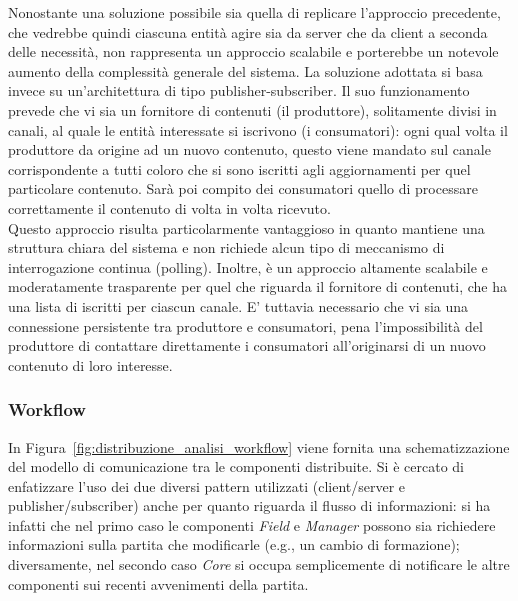 Nonostante una soluzione possibile sia quella di replicare l'approccio precedente, che vedrebbe quindi ciascuna entità agire sia da server che da client a seconda delle necessità, non rappresenta un approccio scalabile e porterebbe un notevole aumento della complessità generale del sistema. La soluzione adottata si basa invece su un'architettura di tipo publisher-subscriber. Il suo funzionamento prevede che vi sia un fornitore di contenuti (il produttore), solitamente divisi in canali, al quale le entità interessate si iscrivono (i consumatori): ogni qual volta il produttore da origine ad un nuovo contenuto, questo viene mandato sul canale corrispondente a tutti coloro che si sono iscritti agli aggiornamenti per quel particolare contenuto. Sarà poi compito dei consumatori quello di processare correttamente il contenuto di volta in volta ricevuto.\\

Questo approccio risulta particolarmente vantaggioso in quanto mantiene una struttura chiara del sistema e non richiede alcun tipo di meccanismo di interrogazione continua (polling). Inoltre, è un approccio altamente scalabile e moderatamente trasparente per quel che riguarda il fornitore di contenuti, che ha una lista di iscritti per ciascun canale. E' tuttavia necessario che vi sia una connessione persistente tra produttore e consumatori, pena l'impossibilità del produttore di contattare direttamente i consumatori all'originarsi di un nuovo contenuto di loro interesse.

\subsubsection{Workflow}
\label{sec:analisi_workflow}

In Figura~\ref{fig:distribuzione_analisi_workflow} viene fornita una schematizzazione del modello di comunicazione tra le componenti distribuite. Si è cercato di enfatizzare l'uso dei due diversi pattern utilizzati (client/server e publisher/subscriber) anche per quanto riguarda il flusso di informazioni: si ha infatti che nel primo caso le componenti \emph{Field} e \emph{Manager} possono sia richiedere informazioni sulla partita che modificarle (e.g., un cambio di formazione); diversamente, nel secondo caso \emph{Core} si occupa semplicemente di notificare le altre componenti sui recenti avvenimenti della partita.


